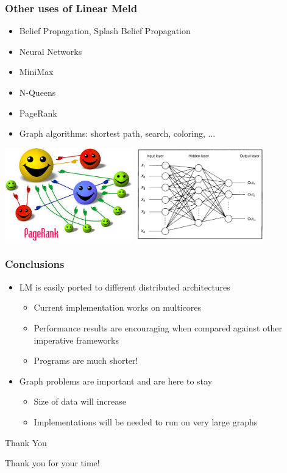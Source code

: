 \documentclass{beamer}
\begin{document}


\begin{frame}[fragile]
   \frametitle{Other uses of Linear Meld}
   \begin{itemize}
      \item Belief Propagation, Splash Belief Propagation
      \item Neural Networks
      \item MiniMax
      \item N-Queens
      \item PageRank
      \item Graph algorithms: shortest path, search, coloring, ...
   \end{itemize}
   \includegraphics[height=4cm]{pagerank.jpeg}
   \includegraphics[height=4cm]{neural_networks.png}
\end{frame}



\begin{frame}
   \frametitle{Conclusions}
   \begin{itemize}
      \item LM is easily ported to different distributed architectures
      \begin{itemize}
         \item Current implementation works on multicores
         \item Performance results are encouraging when compared against other imperative frameworks
         \item Programs are much shorter!
      \end{itemize}
      \item Graph problems are important and are here to stay
      \begin{itemize}
        \item Size of data will increase
        \item Implementations will be needed to run on very large graphs
      \end{itemize}
   \end{itemize}
\end{frame}

\begin{frame}{Thank You}
\begin{center}
{\Huge Thank you for your time!}
\end{center}
\end{frame}
\end{document}
